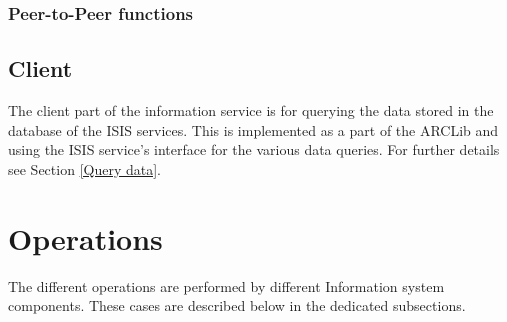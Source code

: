 \documentclass{article}                            %
\begin{document}
\subsubsection{Peer-to-Peer functions}
\label{ISIS Peer-to-Peer functions}
\subsection{Client}
\label{Client}
The client part of the information service is for querying the data stored in the database of the ISIS services. This is implemented as a part of the ARCLib and using the ISIS service's interface for the various data queries. For further details see Section \ref{Query data}.  
\section{Operations}
\label{Operations}
The different operations are performed by different Information system components. These cases are described below in the dedicated subsections. 
\end{document}
